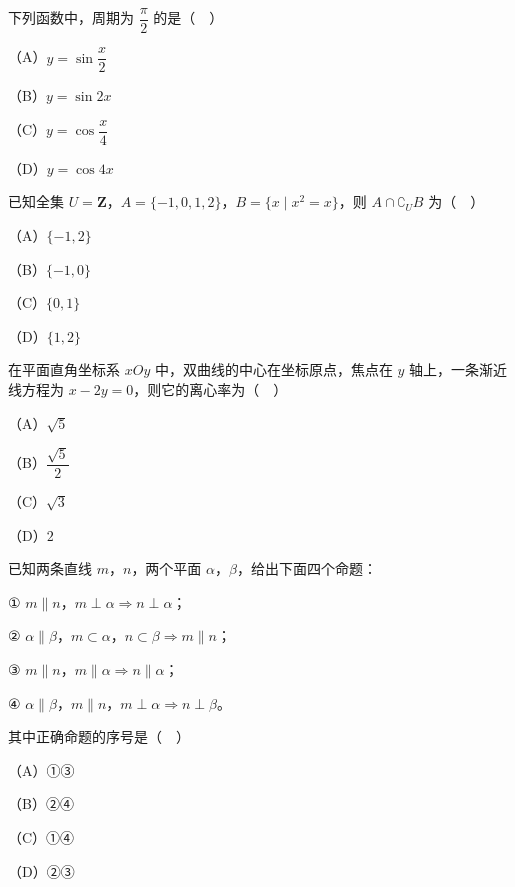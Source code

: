 


\begin{question}
下列函数中，周期为 $\dfrac{\pi}{2}$ 的是（　）

（A）$y=\sin\dfrac{x}{2}$

（B）$y=\sin2x$

（C）$y=\cos\dfrac{x}{4}$

（D）$y=\cos4x$

\end{question}
\begin{question}
已知全集 $U=\mathbf Z$，$A=\{-1,0,1,2\}$，$B=\{x\mid x^2=x\}$，则 $A\cap\complement_UB$ 为（　）

（A）$\{-1,2\}$

（B）$\{-1,0\}$

（C）$\{0,1\}$

（D）$\{1,2\}$

\end{question}
\begin{question}
在平面直角坐标系 $xOy$ 中，双曲线的中心在坐标原点，焦点在 $y$ 轴上，一条渐近线方程为 $x-2y=0$，则它的离心率为（　）

（A）$\sqrt5$

（B）$\dfrac{\sqrt5}{2}$

（C）$\sqrt3$

（D）$2$

\end{question}
\begin{question}
已知两条直线 $m$，$n$，两个平面 $\alpha$，$\beta$，给出下面四个命题：

① $m\parallel n$，$m\perp\alpha\Rightarrow n\perp\alpha$；

② $\alpha\parallel\beta$，$m\subset\alpha$，$n\subset\beta\Rightarrow m\parallel n$；

③ $m\parallel n$，$m\parallel\alpha\Rightarrow n\parallel\alpha$；

④ $\alpha\parallel\beta$，$m\parallel n$，$m\perp\alpha\Rightarrow n\perp\beta$。

其中正确命题的序号是（　）

（A）①③

（B）②④

（C）①④

（D）②③

\end{question}
